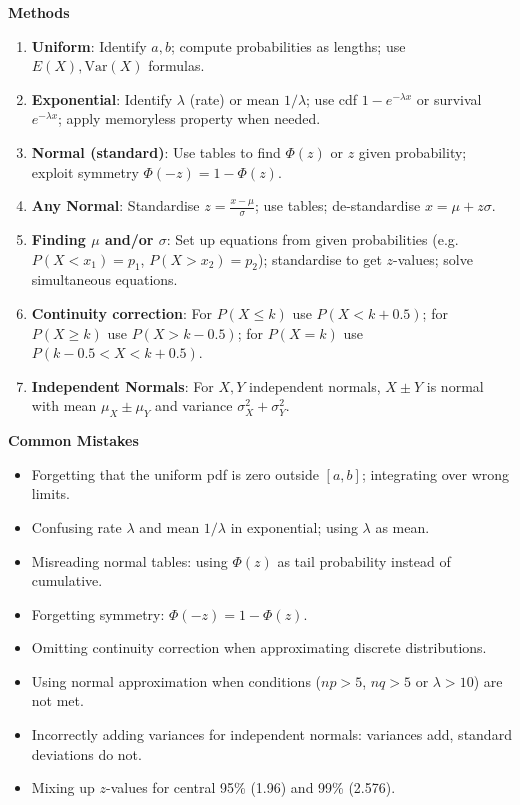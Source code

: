 \documentclass[11pt]{article}
\begin{document}
\begin{bilan}
\textbf{Methods}
\begin{enumerate}
\item \textbf{Uniform}: Identify $a,b$; compute probabilities as lengths; use $E(X),\mathrm{Var}(X)$ formulas.
\item \textbf{Exponential}: Identify $\lambda$ (rate) or mean $1/\lambda$; use cdf $1-e^{-\lambda x}$ or survival $e^{-\lambda x}$; apply memoryless property when needed.
\item \textbf{Normal (standard)}: Use tables to find $\Phi(z)$ or $z$ given probability; exploit symmetry $\Phi(-z)=1-\Phi(z)$.
\item \textbf{Any Normal}: Standardise $z=\frac{x-\mu}{\sigma}$; use tables; de-standardise $x=\mu+z\sigma$.
\item \textbf{Finding $\mu$ and/or $\sigma$}: Set up equations from given probabilities (e.g. $P(X<x_1)=p_1$, $P(X>x_2)=p_2$); standardise to get $z$-values; solve simultaneous equations.
\item \textbf{Continuity correction}: For $P(X\le k)$ use $P(X<k+0.5)$; for $P(X\ge k)$ use $P(X>k-0.5)$; for $P(X=k)$ use $P(k-0.5<X<k+0.5)$.
\item \textbf{Independent Normals}: For $X,Y$ independent normals, $X\pm Y$ is normal with mean $\mu_X\pm\mu_Y$ and variance $\sigma_X^2+\sigma_Y^2$.
\end{enumerate}

\textbf{Common Mistakes}
\begin{itemize}
\item Forgetting that the uniform pdf is zero outside $[a,b]$; integrating over wrong limits.
\item Confusing rate $\lambda$ and mean $1/\lambda$ in exponential; using $\lambda$ as mean.
\item Misreading normal tables: using $\Phi(z)$ as tail probability instead of cumulative.
\item Forgetting symmetry: $\Phi(-z)=1-\Phi(z)$.
\item Omitting continuity correction when approximating discrete distributions.
\item Using normal approximation when conditions ($np>5$, $nq>5$ or $\lambda>10$) are not met.
\item Incorrectly adding variances for independent normals: variances add, standard deviations do not.
\item Mixing up $z$-values for central 95\% (1.96) and 99\% (2.576).
\end{itemize}


\end{bilan}
\end{document}
